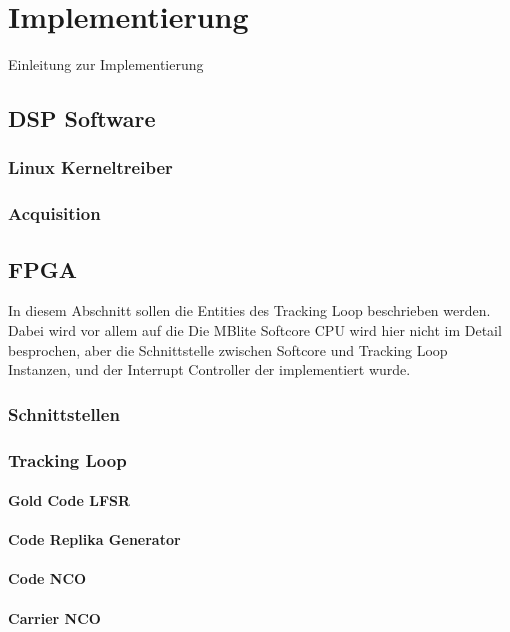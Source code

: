 \chapter{Implementierung}
Einleitung zur Implementierung

\section{DSP Software}

\subsection{Linux Kerneltreiber}\label{Kerneltreiber}


\subsection{Acquisition}

\section{FPGA}
In diesem Abschnitt sollen die Entities des Tracking Loop beschrieben werden. Dabei wird vor allem auf die 
Die MBlite Softcore CPU wird hier nicht im Detail besprochen, aber die Schnittstelle zwischen Softcore und Tracking Loop Instanzen, und der Interrupt Controller der implementiert wurde. 
\subsection{Schnittstellen}

\subsection{Tracking Loop}
\subsubsection{Gold Code LFSR}
\subsubsection{Code Replika Generator}
\subsubsection{Code NCO}
\subsubsection{Carrier NCO}
